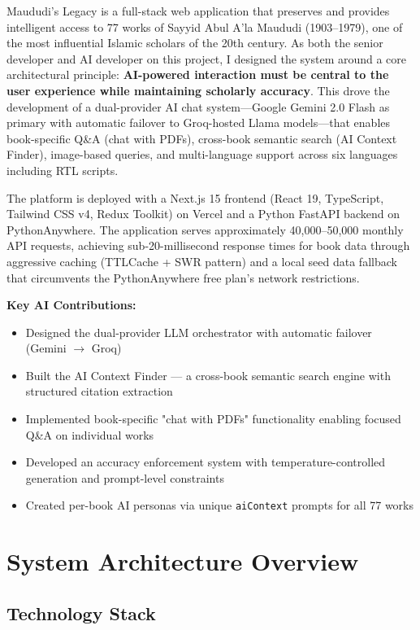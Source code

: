 \documentclass[11pt,a4paper]{article}
\begin{document}
Maududi's Legacy is a full-stack web application that preserves and provides intelligent access to 77 works of Sayyid Abul A'la Maududi (1903--1979), one of the most influential Islamic scholars of the 20th century. As both the senior developer and AI developer on this project, I designed the system around a core architectural principle: \textbf{AI-powered interaction must be central to the user experience while maintaining scholarly accuracy}. This drove the development of a dual-provider AI chat system---Google Gemini 2.0 Flash as primary with automatic failover to Groq-hosted Llama models---that enables book-specific Q\&A (chat with PDFs), cross-book semantic search (AI Context Finder), image-based queries, and multi-language support across six languages including RTL scripts.

The platform is deployed with a Next.js 15 frontend (React 19, TypeScript, Tailwind CSS v4, Redux Toolkit) on Vercel and a Python FastAPI backend on PythonAnywhere. The application serves approximately 40,000--50,000 monthly API requests, achieving sub-20-millisecond response times for book data through aggressive caching (TTLCache + SWR pattern) and a local seed data fallback that circumvents the PythonAnywhere free plan's network restrictions.

\textbf{Key AI Contributions:}
\begin{itemize}[leftmargin=*,nosep]
    \item Designed the dual-provider LLM orchestrator with automatic failover (Gemini $\rightarrow$ Groq)
    \item Built the AI Context Finder --- a cross-book semantic search engine with structured citation extraction
    \item Implemented book-specific "chat with PDFs" functionality enabling focused Q\&A on individual works
    \item Developed an accuracy enforcement system with temperature-controlled generation and prompt-level constraints
    \item Created per-book AI personas via unique \texttt{aiContext} prompts for all 77 works
\end{itemize}
\clearpage

\section{System Architecture Overview}

\subsection{Technology Stack}
\end{document}
